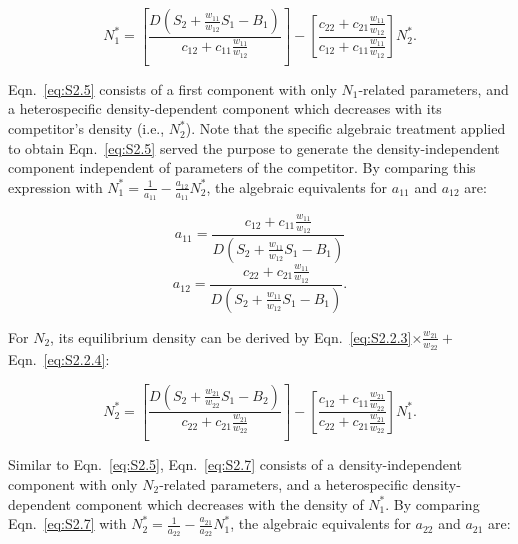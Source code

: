 \begin{equation}
N_1^* = \left[ {\frac{{D\left( {{S_2} + \frac{{{w_{11}}}}{{{w_{12}}}}{S_1} - {B_1}} \right)}}{{{c_{12}} + {c_{11}}\frac{{{w_{11}}}}{{{w_{12}}}}}}} \right] - \left[ {\frac{{{c_{22}} + {c_{21}}\frac{{{w_{11}}}}{{{w_{12}}}}}}{{{c_{12}} + {c_{11}}\frac{{{w_{11}}}}{{{w_{12}}}}}}} \right]N_2^*. 
\tag{S2.5}\label{eq:S2.5}
\end{equation}

Eqn.~\ref{eq:S2.5} consists of a first component with only $N_{1}$-related parameters, and a heterospecific density-dependent component which decreases with its competitor's density (i.e., $N_{2}^{*}$). Note that the specific algebraic treatment applied to obtain Eqn.~\ref{eq:S2.5} served the purpose to generate the density-independent component independent of parameters of the competitor. By comparing this expression with $N_{1}^{*}=\frac{1}{a_{11}}-\frac{a_{12}}{a_{11}}N_{2}^{*}$, the algebraic equivalents for $a_{11}$ and $a_{12}$ are:

\begin{equation}
{a_{11}} = \frac{{{c_{12}} + {c_{11}}\frac{{{w_{11}}}}{{{w_{12}}}}}}{{D\left( {{S_2} + \frac{{{w_{11}}}}{{{w_{12}}}}{S_1} - {B_1}} \right)}}
\tag{S2.6.1}\label{eq:S2.6.1}
\end{equation}
\begin{equation}
{a_{12}} = \frac{{{c_{22}} + {c_{21}}\frac{{{w_{11}}}}{{{w_{12}}}}}}{{D\left( {{S_2} + \frac{{{w_{11}}}}{{{w_{12}}}}{S_1} - {B_1}} \right)}}.
\tag{S2.6.2}\label{eq:S2.6.2}
\end{equation}

\noindent For $N_{2}$, its equilibrium density can be derived by Eqn.~\ref{eq:S2.2.3}$\times \frac{w_{21}}{w_{22}} + $ Eqn.~\ref{eq:S2.2.4}:

\begin{equation}
N_2^* = \left[ {\frac{{D\left( {{S_2} + \frac{{{w_{21}}}}{{{w_{22}}}}{S_1} - {B_2}} \right)}}{{{c_{22}} + {c_{21}}\frac{{{w_{21}}}}{{{w_{22}}}}}}} \right] - \left[ {\frac{{{c_{12}} + {c_{11}}\frac{{{w_{21}}}}{{{w_{22}}}}}}{{{c_{22}} + {c_{21}}\frac{{{w_{21}}}}{{{w_{22}}}}}}} \right]N_1^*.
\tag{S2.7}\label{eq:S2.7}
\end{equation}

Similar to Eqn.~\ref{eq:S2.5}, Eqn.~\ref{eq:S2.7} consists of a density-independent component with only $N_{2}$-related parameters, and a heterospecific density-dependent component which decreases with the density of $N_{1}^{*}$. By comparing Eqn.~\ref{eq:S2.7} with $N_{2}^{*}=\frac{1}{a_{22}}-\frac{a_{21}}{a_{22}}N_{1}^{*}$, the algebraic equivalents for $a_{22}$ and $a_{21}$ are:

